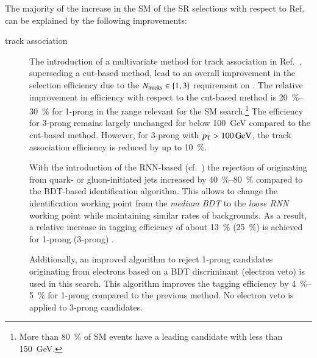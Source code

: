 The majority of the increase in the SM \HH \AccTimesEff of the SR selections
with respect to Ref.~\cite{HIGG-2016-16-witherratum} can be explained by the
following improvements:
\begin{description}

\item[\tauhadvis track association] The introduction of a multivariate method
  for \tauhadvis track association in Ref.~\cite{duschinger}, superseding a
  cut-based method, lead to an overall improvement in the \tauhadvis selection
  efficiency due to the $N_{\text{tracks}} \in \{1, 3\}$ requirement on \tauhadvis. The
  relative improvement in efficiency with respect to the cut-based method is
  \SIrange{20}{30}{\percent} for 1-prong \tauhadvis in the \tauhadvis \pT range
  relevant for the SM \HH search.\footnote{More than \SI{80}{\percent} of SM \HH
    events have a leading \tauhadvis candidate with \pT less than
    \SI{150}{\GeV}.} The efficiency for 3-prong \tauhadvis remains largely
  unchanged for \tauhadvis \pT below \SI{100}{\GeV} compared to the cut-based
  method. However, for 3-prong \tauhadvis with $\pT > \SI{100}{\GeV}$, the track
  association efficiency is reduced by up to \SI{10}{\percent}.

\item[\Tauid] With the introduction of the RNN-based \tauid
  (cf.~) the rejection of \tauhadvis originating from quark- or
  gluon-initiated jets increased by \SIrange{40}{80}{\percent} compared to the
  BDT-based identification algorithm. This allows to change the identification
  working point from the \emph{medium BDT} to the \emph{loose RNN} working point
  while maintaining similar rates of \faketauhadvis backgrounds. As a result, a
  relative increase in \tauhadvis tagging efficiency of about \SI{13}{\percent}
  (\SI{25}{\percent}) is achieved for 1-prong (3-prong) \tauhadvis.

  Additionally, an improved algorithm to reject 1-prong \tauhadvis candidates
  originating from electrons based on a BDT discriminant (electron veto) is used
  in this search. This algorithm improves the tagging efficiency by
  \SIrange{4}{5}{\percent} for 1-prong \tauhadvis compared to the previous
  method. No electron veto is applied to 3-prong \tauhadvis candidates.



\end{description}
